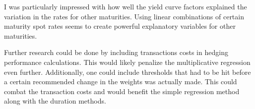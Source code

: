 \documentclass[openany]{book}
\theoremstyle{definition}
\theoremstyle{definition}
\theoremstyle{definition}
\theoremstyle{remark}
\begin{document}
I was particularly impressed with how well the yield curve factors
explained the variation in the rates for other maturities. Using linear
combinations of certain maturity spot rates seems to create powerful
explanatory variables for other maturities.

Further research could be done by including transactions costs in
hedging performance calculations. This would likely penalize the
multiplicative regression even further. Additionally, one could include
thresholds that had to be hit before a certain recommended change in the
weights was actually made. This could combat the transaction costs and
would benefit the simple regression method along with the duration
methods.


\end{document}
